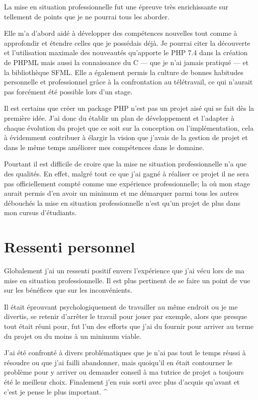 \documentclass[11pt,a4paper,krantz2,11pt,oneside]{krantz}
\begin{document}
La mise en situation professionnelle fut une épreuve très enrichissante sur tellement de points que je ne pourrai tous les aborder.

Elle m'a d'abord aidé à développer des compétences nouvelles tout comme à approfondir et étendre celles que je possédais déjà. Je pourrai citer la découverte et l'utilisation maximale des nouveautés qu'apporte le PHP 7.4 dans la création de PHPML mais aussi la connaissance du C --- que je n'ai jamais pratiqué --- et la bibliothèque SFML. Elle a également permis la culture de bonnes habitudes personnelle et professionnel grâce à la confrontation au télétravail, ce qui n'aurait pas forcément été possible lors d'un stage.

Il est certains que créer un package PHP n'est pas un projet aisé qui se fait dès la première idée. J'ai donc du établir un plan de développement et l'adapter à chaque évolution du projet que ce soit sur la conception ou l'implémentation, cela à évidemment contribuer à élargir la vision que j'avais de la gestion de projet et dans le même temps améliorer mes compétences dans le domaine.

Pourtant il est difficile de croire que la mise ne situation professionnelle n'a que des qualités. En effet, malgré tout ce que j'ai gagné à réaliser ce projet il ne sera pas officiellement compté comme une expérience professionnelle; la où mon stage aurait permis d'en avoir un minimum et me démarquer parmi tous les autres débouchés la mise en situation professionnelle n'est qu'un projet de plus dans mon cursus d'étudiants.

\hypertarget{ressenti-personnel}{%
\section{Ressenti personnel}\label{ressenti-personnel}}

Globalement j'ai un ressenti positif envers l'expérience que j'ai vécu lors de ma mise en situation professionnelle. Il est plus pertinent de se faire un point de vue sur les bénéfices que sur les inconvénients.

Il était éprouvant psychologiquement de travailler au même endroit ou je me divertis, se retenir d'arrêter le travail pour jouer par exemple, alors que presque tout était réuni pour, fut l'un des efforts que j'ai du fournir pour arriver au terme du projet ou du moins à un minimum viable.

J'ai été confronté à divers problématiques que je n'ai pas tout le temps réussi à résoudre ou que j'ai failli abandonner, mais quoiqu'il en était contourner le problème pour y arriver ou demander conseil à ma tutrice de projet a toujours été le meilleur choix. Finalement j'en suis sorti avec plus d'acquis qu'avant et c'est je pense le plus important. \^{}
\end{document}
